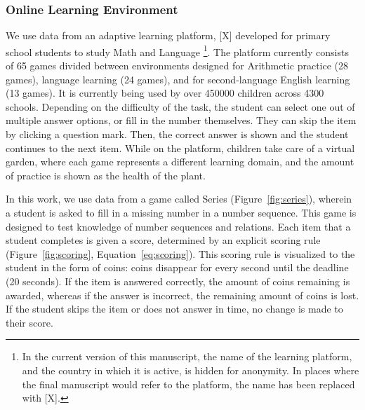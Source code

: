 \documentclass{edm_article}
\begin{document}
\subsubsection{Online Learning Environment}
We use data from an adaptive learning platform, [X] developed for primary school students to study Math and Language \footnote{In the current version of this manuscript, the name of the learning platform, and the country in which it is active, is hidden for anonymity. In places where the final manuscript would refer to the platform, the name has been replaced with [X].}. The platform currently consists of 65 games divided between environments designed for Arithmetic practice (28 games), language learning (24 games), and for second-language English learning (13 games). It is currently being used by over \num{450000} children across \num{4300} schools. Depending on the difficulty of the task, the student can select one out of multiple answer options, or fill in the number themselves. They can skip the item by clicking a question mark. Then, the correct answer is shown and the student continues to the next item. While on the platform, children take care of a virtual garden, where each game represents a different learning domain, and the amount of practice is shown as the health of the plant. 

In this work, we use data from a game called Series (Figure~\ref{fig:series}), wherein a student is asked to fill in a missing number in a number sequence. This game is designed to test knowledge of number sequences and relations. Each item that a student completes is given a score, determined by an explicit scoring rule (Figure~\ref{fig:scoring}, Equation~\ref{eq:scoring}). This scoring rule is visualized to the student in the form of coins: coins disappear for every second until the deadline (20 seconds). If the item is answered correctly, the amount of coins remaining is awarded, whereas if the answer is incorrect, the remaining amount of coins is lost. If the student skips the item or does not answer in time, no change is made to their score. 
\end{document}
